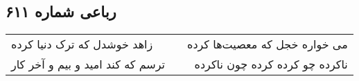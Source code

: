 \begin{center}
\section*{رباعی شماره ۶۱۱}
\label{sec:sh611}
\begin{longtable}{l p{0.5cm} r}
زاهد خوشدل که ترک دنیا کرده
&&
می خواره خجل که معصیت‌ها کرده
\\
ترسم که کند امید و بیم و آخر کار
&&
ناکرده چو کرده کرده چون ناکرده
\\
\end{longtable}
\end{center}
